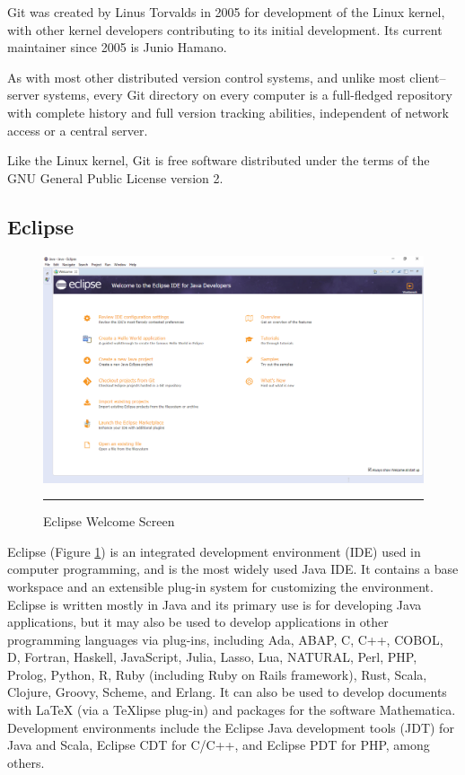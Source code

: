 Git was created by Linus Torvalds in 2005 for development of the Linux kernel, with other kernel developers contributing to its initial development. Its current maintainer since 2005 is Junio Hamano.
\newline

As with most other distributed version control systems, and unlike most client–server systems, every Git directory on every computer is a full-fledged repository with complete history and full version tracking abilities, independent of network access or a central server.
\newline

Like the Linux kernel, Git is free software distributed under the terms of the GNU General Public License version 2.

\subsection{Eclipse}
\begin{figure}[h!]
	\centering
	\includegraphics[width=1\textwidth]{./images/eclipse}
	\rule{1\textwidth}{1pt}
	\caption{Eclipse Welcome Screen}
	\label{fig:eclipse}
\end{figure}
Eclipse (Figure \ref{fig:eclipse}) is an integrated development environment (IDE) used in computer programming, and is the most widely used Java IDE. It contains a base workspace and an extensible plug-in system for customizing the environment. Eclipse is written mostly in Java and its primary use is for developing Java applications, but it may also be used to develop applications in other programming languages via plug-ins, including Ada, ABAP, C, C++, COBOL, D, Fortran, Haskell, JavaScript, Julia, Lasso, Lua, NATURAL, Perl, PHP, Prolog, Python, R, Ruby (including Ruby on Rails framework), Rust, Scala, Clojure, Groovy, Scheme, and Erlang. It can also be used to develop documents with LaTeX (via a TeXlipse plug-in) and packages for the software Mathematica. Development environments include the Eclipse Java development tools (JDT) for Java and Scala, Eclipse CDT for C/C++, and Eclipse PDT for PHP, among others.
\newline

